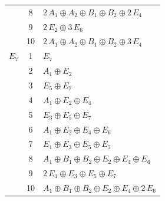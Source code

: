 \documentclass[11pt]{article}
\begin{document}
\begin{longtable}{l c p{}}
 & 8 & $2\,A_{1}\oplus A_{2}\oplus B_{1}\oplus B_{2}\oplus 2\,E_{4}$\\
 & 9 & $2\,E_{2}\oplus 3\,E_{6}$\\
 & 10 & $2\,A_{1}\oplus A_{2}\oplus B_{1}\oplus B_{2}\oplus 3\,E_{4}$\\
\hline
$E_{7}$ & 1 & $E_{7}$\\
 & 2 & $A_{1}\oplus E_{2}$\\
 & 3 & $E_{5}\oplus E_{7}$\\
 & 4 & $A_{1}\oplus E_{2}\oplus E_{4}$\\
 & 5 & $E_{3}\oplus E_{5}\oplus E_{7}$\\
 & 6 & $A_{1}\oplus E_{2}\oplus E_{4}\oplus E_{6}$\\
 & 7 & $E_{1}\oplus E_{3}\oplus E_{5}\oplus E_{7}$\\
 & 8 & $A_{1}\oplus B_{1}\oplus B_{2}\oplus E_{2}\oplus E_{4}\oplus E_{6}$\\
 & 9 & $2\,E_{1}\oplus E_{3}\oplus E_{5}\oplus E_{7}$\\
 & 10 & $A_{1}\oplus B_{1}\oplus B_{2}\oplus E_{2}\oplus E_{4}\oplus 2\,E_{6}$\\
\hline
\end{longtable}
\end{document}
